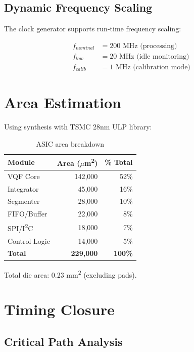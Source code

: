 \subsection{Dynamic Frequency Scaling}

The clock generator supports run-time frequency scaling:

\begin{align}
    f_{nominal} &= 200 \text{ MHz (processing)} \\
    f_{low} &= 20 \text{ MHz (idle monitoring)} \\
    f_{calib} &= 1 \text{ MHz (calibration mode)}
\end{align}

\section{Area Estimation}

Using synthesis with TSMC 28nm ULP library:

\begin{table}[h]
    \centering
    \caption{ASIC area breakdown}
    \label{tab:area}
    \begin{tabular}{lrr}
        \toprule
        \textbf{Module} & \textbf{Area ($\mu$m\textsuperscript{2})} & \textbf{\% Total} \\
        \midrule
        VQF Core & 142,000 & 52\% \\
        Integrator & 45,000 & 16\% \\
        Segmenter & 28,000 & 10\% \\
        FIFO/Buffer & 22,000 & 8\% \\
        SPI/I\textsuperscript{2}C & 18,000 & 7\% \\
        Control Logic & 14,000 & 5\% \\
        \midrule
        \textbf{Total} & \textbf{229,000} & \textbf{100\%} \\
        \bottomrule
    \end{tabular}
\end{table}

Total die area: 0.23 mm\textsuperscript{2} (excluding pads).

\section{Timing Closure}

\subsection{Critical Path Analysis}


